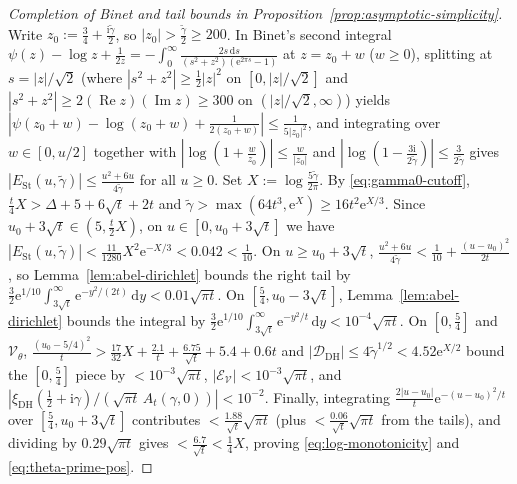 \documentclass[11pt,a4paper,reqno]{amsart}
\theoremstyle{definition}
\theoremstyle{remark}
\numberwithin{equation}{section}
\newcommand{\dd}{\mathrm{d}}
\newcommand{\ii}{\mathrm{i}}
\newcommand{\ee}{\mathrm{e}}
\DeclareMathOperator{\Reop}{Re}
\DeclareMathOperator{\Imop}{Im}
\begin{document}
\begin{proof}[Completion of Binet and tail bounds in Proposition~\ref{prop:asymptotic-simplicity}]
Write $z_0 := \frac{3}{4} + \frac{\ii\tilde{\gamma}}{2}$, so $|z_0| > \frac{\tilde{\gamma}}{2} \ge 200$. In Binet's second integral $\psi(z) - \log z + \frac{1}{2z} = -\int_{0}^{\infty}\frac{2s\,\dd s}{(s^2 + z^2)(\ee^{2\pi s} - 1)}$ at $z = z_0 + w$ ($w \ge 0$), splitting at $s = |z|/\sqrt{2}$ (where $|s^2 + z^2| \ge \frac{1}{2}|z|^2$ on $[0, |z|/\sqrt{2}]$ and $|s^2 + z^2| \ge 2(\Reop z)(\Imop z) \ge 300$ on $(|z|/\sqrt{2}, \infty)$) yields $|\psi(z_0 + w) - \log(z_0 + w) + \frac{1}{2(z_0 + w)}| \le \frac{1}{5|z_0|^2}$, and integrating over $w \in [0, u/2]$ together with $|\log(1 + \frac{w}{z_0})| \le \frac{w}{|z_0|}$ and $|\log(1 - \frac{3\ii}{2\tilde{\gamma}})| \le \frac{3}{2\tilde{\gamma}}$ gives $|E_{\mathrm{St}}(u,\tilde{\gamma})| \le \frac{u^2 + 6u}{4\tilde{\gamma}}$ for all $u \ge 0$. Set $X := \log\frac{5\tilde{\gamma}}{2\pi}$. By \eqref{eq:gamma0-cutoff}, $\frac{t}{4}X > \Delta + 5 + 6\sqrt{t} + 2t$ and $\tilde{\gamma} > \max(64t^3, \ee^X) \ge 16t^2\ee^{X/3}$. Since $u_0 + 3\sqrt{t} \in (5, \frac{t}{2}X)$, on $u \in [0, u_0 + 3\sqrt{t}]$ we have $|E_{\mathrm{St}}(u,\tilde{\gamma})| < \frac{11}{1280}X^2\ee^{-X/3} < 0.042 < \frac{1}{10}$. On $u \ge u_0 + 3\sqrt{t}$, $\frac{u^2 + 6u}{4\tilde{\gamma}} < \frac{1}{10} + \frac{(u - u_0)^2}{2t}$, so Lemma~\ref{lem:abel-dirichlet} bounds the right tail by $\frac{3}{2}\ee^{1/10}\int_{3\sqrt{t}}^{\infty}\ee^{-y^2/(2t)}\,\dd y < 0.01\sqrt{\pi t}$. On $[\frac{5}{4}, u_0 - 3\sqrt{t}]$, Lemma~\ref{lem:abel-dirichlet} bounds the integral by $\frac{3}{2}\ee^{1/10}\int_{3\sqrt{t}}^{\infty}\ee^{-y^2/t}\,\dd y < 10^{-4}\sqrt{\pi t}$. On $[0, \frac{5}{4}]$ and $\mathcal{V}_\theta$, $\frac{(u_0 - 5/4)^2}{t} > \frac{17}{32}X + \frac{2.1}{t} + \frac{6.75}{\sqrt{t}} + 5.4 + 0.6t$ and $|\mathcal{D}_{\mathrm{DH}}| \le 4\tilde{\gamma}^{1/2} < 4.52\ee^{X/2}$ bound the $[0, \frac{5}{4}]$ piece by $< 10^{-3}\sqrt{\pi t}$, $|\mathcal{E}_{\mathcal{V}}| < 10^{-3}\sqrt{\pi t}$, and $|\xi_{\mathrm{DH}}(\frac{1}{2}+\ii\gamma)/(\sqrt{\pi t}\,A_t(\gamma,0))| < 10^{-2}$. Finally, integrating $\frac{2|u - u_0|}{t}\ee^{-(u-u_0)^2/t}$ over $[\frac{5}{4}, u_0 + 3\sqrt{t}]$ contributes $< \frac{1.88}{\sqrt{t}}\sqrt{\pi t}$ (plus $< \frac{0.06}{\sqrt{t}}\sqrt{\pi t}$ from the tails), and dividing by $0.29\sqrt{\pi t}$ gives $< \frac{6.7}{\sqrt{t}} < \frac{1}{4}X$, proving \eqref{eq:log-monotonicity} and \eqref{eq:theta-prime-pos}.
\end{proof}
\end{document}
